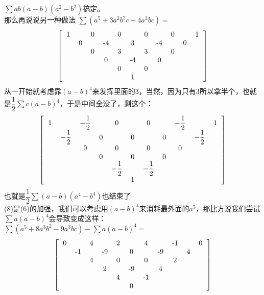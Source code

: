 \documentclass[UTF8]{ctexart}
\begin{document}
$ \displaystyle \sum ab(a-b)(a^{2}-b^{2}) $搞定。\\
那么再说说另一种做法
$ \displaystyle \sum (a^{5}+3a^{2}b^{2}c-4a^{3}bc)= $
  \renewcommand*{\arraystretch}{1.732}\[\left[\begin{matrix}
  	\begin{tabular}{ccccccccccccc}
  		1& &0& &0& &0& &0& &1\\
  		&0& &-4& &3& &-4& &0&\\
  		& &0& &3& &3& &0& &\\
  		& & &0& &-4& &0& & &\\
  		& & & &0& &0& & & &\\
  		& & & & &1& & & & &\\
  	\end{tabular}
  \end{matrix}\right]\]
从一开始就考虑靠$ (a-b)^{4} $来发挥里面的3，当然，因为只有3所以拿半个，也就是$ \dfrac{1}{2} \displaystyle \sum c(a-b)^{4} $，于是中间全没了，剩这个：
 \renewcommand*{\arraystretch}{1.732}\[\left[\begin{matrix}
	\begin{tabular}{ccccccccccccc}
		1& &$ -\dfrac{1}{2} $& &0& &0& &$ -\dfrac{1}{2} $& &1\\
		&$ -\dfrac{1}{2} $& &0& &0& &0& &$ -\dfrac{1}{2} $&\\
		& &0& &0& &0& &0& &\\
		& & &0& &0& &0& & &\\
		& & & &$ -\dfrac{1}{2} $& &$ -\dfrac{1}{2} $& & & &\\
		& & & & &1& & & & &\\
	\end{tabular}
  \end{matrix}\right]\]
也就是$ \displaystyle \dfrac{1}{2} \displaystyle \sum (a-b)(a^{4}-b^{4}) $也结束了\\
(8)是(6)的加强，我们可以考虑用$ (a-b)^{4} $来消耗最外面的$ a^5 $，那比方说我们尝试$ \displaystyle \sum a(a-b)^{4} $会导致变成这样：\\
$  \displaystyle \sum (a^{5}+8 a^{3} b^{2}-9a^{3}bc)-\displaystyle \sum a(a-b)^{4}=$
  \renewcommand*{\arraystretch}{1.732}\[\left[\begin{matrix}
  	\begin{tabular}{ccccccccccccc}
  		0& &4& &2& &4& &-1& &0\\
  		&-1& &-9& &0& &-9& &4&\\
  		& &4& &0& &0& &2& &\\
  		& & &2& &-9& &4& & &\\
  		& & & &4& &-1& & & &\\
  		& & & & &0& & & & &\\
  	\end{tabular}
  \end{matrix}\right]\]
\end{document}
